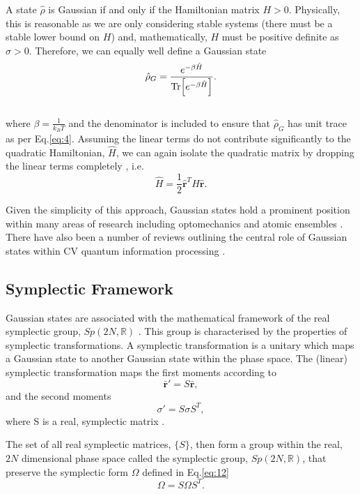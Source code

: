 \documentclass[11pt,a4paper]{article}
\numberwithin{equation}{section}
\begin{document}
	
	A state $\hat{\rho}$ is Gaussian if and only if the Hamiltonian matrix $ \mathit{H} > 0$. Physically, this is reasonable as we are only considering stable systems (there must be a stable lower bound on $H$) and, mathematically, $H$ must be positive definite as $\sigma>0$. Therefore, we can equally well define a Gaussian state
	\begin{equation} \label{eq:21}
	\hat{\rho}_G = \frac{e^{-\beta \hat{H}}}{\Tr[e^{-\beta \hat{H}}]}.
	\end{equation}\\
	where $\beta = \frac{1}{k_BT}$ and the denominator is included to ensure that $\hat{\rho}_G$ has unit trace as per Eq.\ref{eq:4}. Assuming the linear terms do not contribute significantly to the quadratic Hamiltonian, $\hat{H}$, we can again isolate the quadratic matrix by dropping the linear terms completely \cite{Genoni16}, i.e.
	\begin{equation} \label{eq:22}
	\hat{H} = \frac{1}{2}\mathbf{\hat{r}}^{T}H\mathbf{\hat{r}}.
	\end{equation}
	
	Given the simplicity of this approach, Gaussian states hold a prominent position within many areas of research including optomechanics \cite{Genoni15} and atomic ensembles \cite{Sherson}. There have also been a number of reviews outlining the central role of Gaussian states within CV quantum information processing \cite{Napoli05, Weedbrook12}. 
	
	\subsection{Symplectic Framework}
	\label{sec:symplectic}
	Gaussian states are associated with the mathematical framework of the real symplectic group, $Sp(2N, \mathbb{R})$ \cite{Arvind95}. This group is characterised by the properties of symplectic transformations. A symplectic transformation is a unitary which maps a Gaussian state to another Gaussian state within the phase space. The (linear) symplectic transformation maps the first moments according to
	\begin{equation}\label{eq:23}
	\mathbf{\bar{r}}' = S \mathbf{\bar{r}},
	\end{equation}
	and the second moments
	\begin{equation}\label{eq:24}
	\sigma' = S\sigma S^T,
	\end{equation}
	where S is a real, symplectic matrix \cite{Adesso14}.
	
	The set of all real symplectic matrices, $\{S\}$, then form a group within the real, $2N$ dimensional phase space called the symplectic group, $Sp(2N, \mathbb{R})$, that preserve the symplectic form $\Omega$ defined in Eq.\ref{eq:12}
	\begin{equation} \label{eq:25}
	\Omega = S\Omega S^T .
	\end{equation}
	
\end{document}
